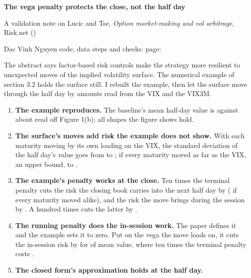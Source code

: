 \documentclass[10pt]{article}
\newcommand{\paper}[1]{#1}  %
\begin{document}
{\sffamily\bfseries\LARGE The vega penalty protects the close, not the half day\par}
\vspace{3pt}
{\large A validation note on Lucic and Tse, \emph{Option market-making and vol arbitrage}, Risk.net ()\par}
\vspace{3pt}
{\small\color{quiet}Dac Vinh Nguyen \quad\textbullet\quad {} \quad\textbullet\quad code, data steps and checks: \href{\val{repo-url}}{} \quad\textbullet\quad page: \href{\val{page-url}}{}\par}
\vspace{6pt}

\begin{summary}
The abstract says factor-based risk controls make the strategy more resilient to unexpected moves of the implied volatility surface. The numerical example of \paper{section 3.2} holds the surface still. I rebuilt the example, then let the surface move through the half day by amounts read from the VIX and the VIX3M.
\begin{enumerate}\setlength{\itemsep}{1pt}\setlength{\parskip}{0pt}
\item \textbf{The example reproduces.} The baseline's mean half-day value is  against about  read off \paper{Figure 1(b)}; all  shapes the figure shows hold.
\item \textbf{The surface's moves add risk the example does not show.} With each maturity moving by its own loading on the VIX, the standard deviation of the half day's value goes from  to ; if every maturity moved as far as the VIX, an upper bound, to .
\item \textbf{The example's penalty works at the close.} Ten times the terminal penalty cuts the risk the closing book carries into the next half day by  ( if every maturity moved alike), and the risk the move brings during the session by . A hundred times cuts the latter by .
\item \textbf{The running penalty does the in-session work.} The paper defines it and the example sets it to zero. Put on the vega the move loads on, it cuts the in-session risk by  for  of mean value, where ten times the terminal penalty costs .
\item \textbf{The closed form's approximation holds at the half day.} 
\end{enumerate}
\end{summary}
\end{document}
